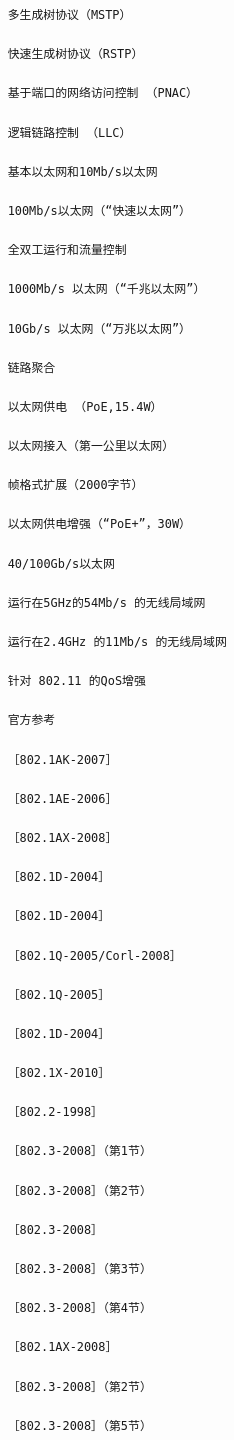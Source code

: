 \begin{verbatim}
    多生成树协议（MSTP）
    
    快速生成树协议（RSTP）
    
    基于端口的网络访问控制 （PNAC）
    
    逻辑链路控制 （LLC）
    
    基本以太网和10Mb/s以太网
    
    100Mb/s以太网（“快速以太网”）
    
    全双工运行和流量控制
    
    1000Mb/s 以太网（“千兆以太网”）
    
    10Gb/s 以太网（“万兆以太网”）
    
    链路聚合
    
    以太网供电 （PoE,15.4W）
    
    以太网接入（第一公里以太网）
    
    帧格式扩展（2000字节）
    
    以太网供电增强（“PoE+”，30W）
    
    40/100Gb/s以太网
    
    运行在5GHz的54Mb/s 的无线局域网
    
    运行在2.4GHz 的11Mb/s 的无线局域网
    
    针对 802.11 的QoS增强
    
    官方参考
    
    ［802.1AK-2007］
    
    ［802.1AE-2006］
    
    ［802.1AX-2008］
    
    ［802.1D-2004］
    
    ［802.1D-2004］
    
    ［802.1Q-2005/Corl-2008］
    
    ［802.1Q-2005］
    
    ［802.1D-2004］
    
    ［802.1X-2010］
    
    ［802.2-1998］
    
    ［802.3-2008］（第1节）
    
    ［802.3-2008］（第2节）
    
    ［802.3-2008］
    
    ［802.3-2008］（第3节）
    
    ［802.3-2008］（第4节）
    
    ［802.1AX-2008］
    
    ［802.3-2008］（第2节）
    
    ［802.3-2008］（第5节）
    

\end{verbatim}

